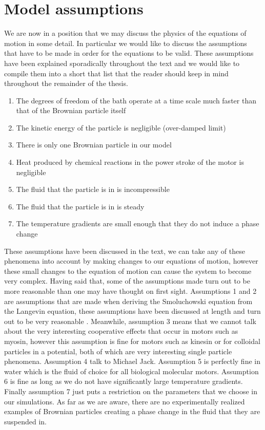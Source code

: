 \section{Model assumptions}
We are now in a position that we may discuss the physics of the equations of motion in some detail. In particular we would like to discuss the assumptions that have to be made in order for the equations to be valid. These assumptions have been explained sporadically throughout the text and we would like to compile them into a short that list that the reader should keep in mind throughout the remainder of the thesis.
\begin{enumerate}
\item{The degrees of freedom of the bath operate at a time scale much faster than that of the Brownian particle itself}
\item{The kinetic energy of the particle is negligible (over-damped limit)}
\item{There is only one Brownian particle in our model}
\item{Heat produced by chemical reactions in the power stroke of the motor is negligible}
\item{The fluid that the particle is in is incompressible}
\item{The fluid that the particle is in is steady}
\item{The temperature gradients are small enough that they do not induce a phase change}
\end{enumerate}
These assumptions have been discussed in the text, we can take any of these phenomena into account by making changes to our equations of motion, however these small changes to the equation of motion can cause the system to become very complex. Having said that, some of the assumptions made turn out to be more reasonable than one may have thought on first sight. Assumptions 1 and 2 are assumptions that are made when deriving the Smoluchowski equation from the Langevin equation, these assumptions have been discussed at length and turn out to be very reasonable \cite{Reimann2001,Gardiner2009,Einstein1905,KellerBustamante2000,Kramers1940}. Meanwhile, assumption 3 means that we cannot talk about the very interesting cooperative effects that occur in motors such as myosin, however this assumption is fine for motors such as kinesin or for colloidal particles in a potential, both of which are very interesting single particle phenomena. Assumption 4 {\color{red} talk to Michael Jack}. Assumption 5 is perfectly fine in water which is the fluid of choice for all biological molecular motors. Assumption 6 is fine as long as we do not have significantly large temperature gradients. Finally assumption 7 just puts a restriction on the parameters that we choose in our simulations. As far as we are aware, there are no experimentally realized examples of Brownian particles creating a phase change in the fluid that they are suspended in.





